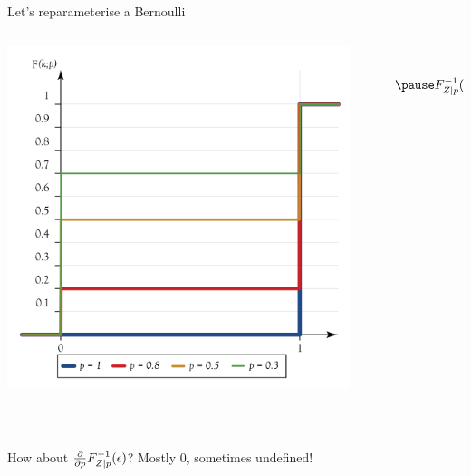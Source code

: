 \begin{frame}{Let's reparameterise a Bernoulli}

	\begin{columns}
	\begin{column}{0.35\textwidth}
	\includegraphics[scale=0.15]{bernoulli-cdf}
	\end{column}
	~
	\begin{column}{0.45\textwidth}
	\begin{equation*}
		\begin{aligned}
			Z &\sim \Bernoulli(p) \\ \pause
			\inv{F}_{Z|p}(\epsilon) &= 
			\begin{cases}
			1 &\text{if }\epsilon < p \\
			0 &\text{otherwise}
			\end{cases} \\
			&= \mathds 1_{(0, p)}(\epsilon)
		\end{aligned}
	\end{equation*}
	\end{column}

	\end{columns}
	
	~
	
	\pause
	
	How about $\pdv{p}\inv{F}_{Z|p}(\epsilon)$? \pause \alert{Mostly $0$, sometimes undefined!}
	
\end{frame}

